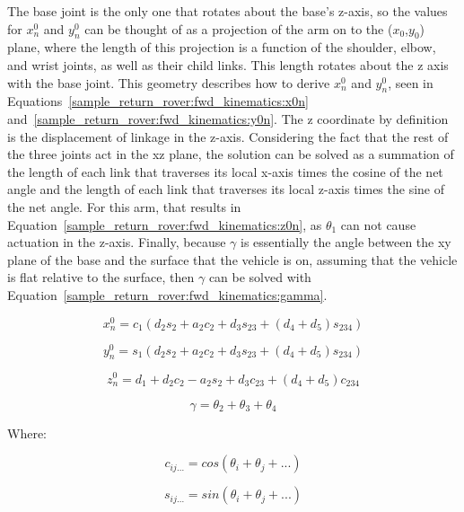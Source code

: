 The base joint is the only one that rotates about the base's z-axis, so the values for $x^{0}_{n}$ and $y^{0}_{n}$ can be thought of as a projection of the arm on to the ($x_{0}$,$y_{0}$) plane, where the length of this projection is a function of the shoulder, elbow, and wrist joints, as well as their child links. This length rotates about the z axis with the base joint. This geometry describes how to derive $x^{0}_{n}$ and $y^{0}_{n}$, seen in Equations~\ref{sample_return_rover:fwd_kinematics:x0n} and~\ref{sample_return_rover:fwd_kinematics:y0n}. The z coordinate by definition is the displacement of linkage in the z-axis. Considering the fact that the rest of the three joints act in the xz plane, the solution can be solved as a summation of the length of each link that traverses its local x-axis times the cosine of the net angle and the length of each link that traverses its local z-axis times the sine of the net angle. For this arm, that results in Equation~\ref{sample_return_rover:fwd_kinematics:z0n}, as $\theta_{1}$ can not cause actuation in the z-axis. Finally, because $\gamma$ is essentially the angle between the xy plane of the base and the surface that the vehicle is on, assuming that the vehicle is flat relative to the surface, then $\gamma$ can be solved with Equation~\ref{sample_return_rover:fwd_kinematics:gamma}.

\begin{equation}\label{sample_return_rover:fwd_kinematics:x0n}
	x^{0}_{n} = c_{1}\left(d_{2}s_{2}+a_{2}c_{2}+d_{3}s_{23}+(d_{4}+d_{5})s_{234}\right)
\end{equation}

\begin{equation}\label{sample_return_rover:fwd_kinematics:y0n}
	y^{0}_{n} = s_{1}\left(d_{2}s_{2}+a_{2}c_{2}+d_{3}s_{23}+(d_{4}+d_{5})s_{234}\right)
\end{equation}

\begin{equation}\label{sample_return_rover:fwd_kinematics:z0n}
	z^{0}_{n} = d_{1}+d_{2}c_{2}-a_{2}s_{2}+d_{3}c_{23}+(d_{4}+d_{5})c_{234}
\end{equation}

\begin{equation}\label{sample_return_rover:fwd_kinematics:gamma}
	\gamma = \theta_{2} + \theta_{3} + \theta_{4}
\end{equation}

Where:

\begin{equation}\label{sample_return_rover:fwd_kinematics:cij}
	c_{ij...} = cos(\theta_{i} + \theta_{j} + ...)
\end{equation}

\begin{equation}\label{sample_return_rover:fwd_kinematics:sij}
	s_{ij...} = sin(\theta_{i} + \theta_{j} + ...)
\end{equation}
